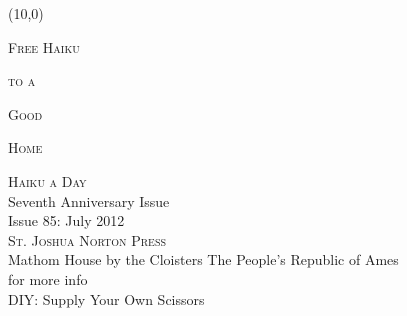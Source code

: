 \documentclass[10pt]{article}
\begin{document}
\begin{textblock}{13}(10,0)
    \begin{minipage}[t][8.5in]{3.25in}

	\begin{center}
	    {\fontsize{72}{86}\selectfont \textsc{ Free }}
	    \vspace*{1cm}
	    {\fontsize{72}{86}\selectfont \textsc{ Haiku }}
	\end{center}

	\begin{center}
	    \vspace*{2cm}
	    {\fontsize{48}{60}\selectfont \textsc{to a }}
	    \vspace*{1cm}
	\end{center}

	\begin{center}
	    {\fontsize{72}{86}\selectfont \textsc{Good}}
	\end{center}
	\vspace*{1cm}
	\begin{center}
	    {\fontsize{72}{86}\selectfont \textsc{Home}}
	\end{center} 
    
	\vspace*{2cm}
	\begin{center}
	    {\fontsize{20}{32}\selectfont \textsc{Haiku a Day }} \\
	    Seventh Anniversary Issue \\[2.5mm]
	    {\large{Issue 85: July 2012}} \\[2.5mm]
	    {\fontsize{8}{8}\selectfont  \textsc{ St. Joshua Norton Press }} \\[1mm]
	    {\fontsize{6}{6}\selectfont Mathom House by the Cloisters \textbar The People's Republic of Ames }\\[1mm]
	    {\fontsize{6}{6}\selectfont {\tt kula.tproa.net/had/ } for more info}\\[1mm]
	    {\fontsize{6}{6}\selectfont DIY: Supply Your Own Scissors }
	\end{center}

    \end{minipage}
\end{textblock}
\end{document}
